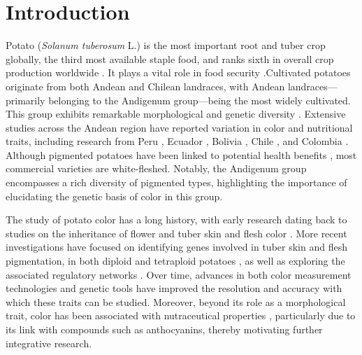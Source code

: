\documentclass[pdflatex,sn-mathphys-ay]{sn-jnl}%
\begin{document}
\section{Introduction}\label{sec1}
Potato (\textit{Solanum tuberosum} L.) is the most important root and tuber crop globally, the third most available staple food, and ranks sixth in overall crop production worldwide \citep{FAO2024}. It plays a vital role in food security \citep{devaux2021potato}.Cultivated potatoes originate from both Andean and Chilean landraces, with Andean landraces—primarily belonging to the Andigenum group—being the most widely cultivated. This group exhibits remarkable morphological and genetic diversity \citep{spooner2005single}. Extensive studies across the Andean region have reported variation in color and nutritional traits, including research from Peru \citep{bellumori2020study}, Ecuador \citep{balladares2018evaluacion}, Bolivia \citep{larico2024descripcion}, Chile \citep{behn2023phenolic}, and Colombia \citep{Berdugo2017,berdugo2023phenotypic,garnica2012characterization}. Although pigmented potatoes have been linked to potential health benefits \citep{bvenura2022pigmented,lachman2005red}, most commercial varieties are white-fleshed. Notably, the Andigenum group encompasses a rich diversity of pigmented types, highlighting the importance of elucidating the genetic basis of color in this group.




The study of potato color has a long history, with early research dating back to studies on the inheritance of flower and tuber skin and flesh color \citep{salaman1911inheritance, lunden1932notes, black1933studies,  dodds1955inheritance,van1994inheritance}. More recent investigations have focused on identifying genes involved in tuber skin and flesh pigmentation, in both diploid \citep{parra2019chromosomes} and tetraploid potatoes \citep{zhang2009genetic, pandey2022genomic,yusuf2024genomic}, as well as exploring the associated regulatory networks \citep{cho2016network,bonar2018potato}. Over time, advances in both color measurement technologies and genetic tools have improved the resolution and accuracy with which these traits can be studied. Moreover, beyond its role as a morphological trait, color has been associated with nutraceutical properties \citep{dodds1955inheritance,parra2019chromosomes, li2024transcriptomic,cho2016network}, particularly due to its link with compounds such as anthocyanins, thereby motivating further integrative research.  
\end{document}
